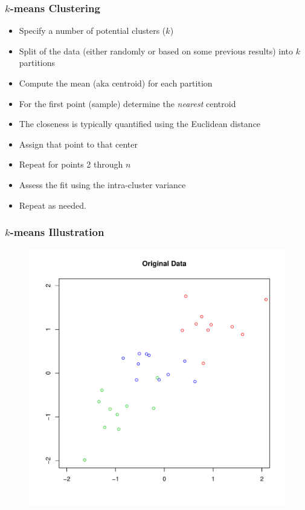 \documentclass[xcolor=x11names,compress]{beamer}\usepackage[]{graphicx}\usepackage[]{color}
\begin{document}
\begin{frame}
  \frametitle{$k$-means Clustering}
  \begin{itemize}
\item Specify a number of potential clusters ($k$)
\item Split of the data (either randomly or based on some previous results) into $k$ partitions
\item Compute the mean (aka centroid) for each partition
\item For the first point (sample) determine the {\it nearest} centroid
\item The closeness is typically quantified using the Euclidean distance
\item Assign that point to that center
\item Repeat for points 2 through $n$
\item Assess the fit using the intra-cluster variance
\item Repeat as needed.
\end{itemize}
\end{frame}
\begin{frame}
  \frametitle{$k$-means Illustration}
\begin{figure}
   \centering
   \includegraphics[scale=0.45]{Figures/kmean1.pdf}
 \end{figure}

\end{frame}
\end{document}
